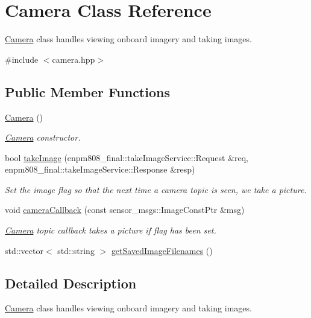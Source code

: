 \hypertarget{classCamera}{\section{Camera Class Reference}
\label{classCamera}
}


\hyperlink{classCamera}{Camera} class handles viewing onboard imagery and taking images.  




{\ttfamily \#include $<$camera.\-hpp$>$}

\subsection*{Public Member Functions}
\begin{DoxyCompactItemize}
\item 
\hyperlink{classCamera_a01f94c3543f56ede7af49dc778f19331}{Camera} ()
\begin{DoxyCompactList}\small\item\em \hyperlink{classCamera}{Camera} constructor. \end{DoxyCompactList}\item 
bool \hyperlink{classCamera_a2702d5875c0b442aa1527a47c0b495de}{take\-Image} (enpm808\-\_\-final\-::take\-Image\-Service\-::\-Request \&req, enpm808\-\_\-final\-::take\-Image\-Service\-::\-Response \&resp)
\begin{DoxyCompactList}\small\item\em Set the image flag so that the next time a camera topic is seen, we take a picture. \end{DoxyCompactList}\item 
void \hyperlink{classCamera_aff57f8419ee9de1262592171a84ddf8d}{camera\-Callback} (const sensor\-\_\-msgs\-::\-Image\-Const\-Ptr \&msg)
\begin{DoxyCompactList}\small\item\em \hyperlink{classCamera}{Camera} topic callback takes a picture if flag has been set. \end{DoxyCompactList}\item 
std\-::vector$<$ std\-::string $>$ \hyperlink{classCamera_a7af4db092be152e181938768b464e9b0}{get\-Saved\-Image\-Filenames} ()
\end{DoxyCompactItemize}


\subsection{Detailed Description}
\hyperlink{classCamera}{Camera} class handles viewing onboard imagery and taking images. 

